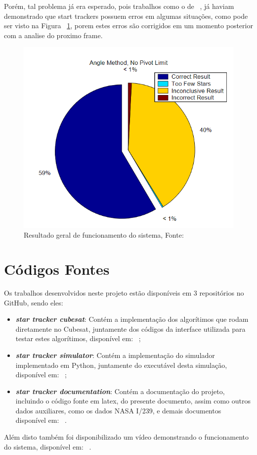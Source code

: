 Porém, tal problema já era esperado, pois trabalhos como o de ~\cite{Cole},
já haviam demonstrado que start trackers possuem erros em algumas situações, como pode ser visto na Figura ~\ref{fig:me_salva},
porem estes erros são corrigidos em um momento posterior com a analise do proximo frame.

\begin{figure}[H]
    \centering
    \includegraphics[width=.8\textwidth]{images/me_salva.png}
    \caption{Resultado geral de funcionamento do sistema, Fonte: ~\cite{Cole}}
    \label{fig:me_salva}
\end{figure}



\section{Códigos Fontes}

Os trabalhos desenvolvidos neste projeto estão disponíveis em 3 repositórios no GitHub, sendo eles:

\begin{itemize}
    \item \textbf{\textit{star tracker cubesat}}: Contém a implementação dos algorítimos que rodam diretamente no Cubesat, 
    juntamente dos códigos da interface utilizada para testar estes algorítimos, disponível em: ~\cite[]{Parreira_star_tracker_cubesat_2022};
    \item \textbf{\textit{star tracker simulator}}: Contém a implementação do simulador implementado em Python, 
    juntamente do executável desta simulação, disponível em: ~\cite[]{Parreira_Star_Tracker_Simulator_2022};
    \item \textbf{\textit{star tracker documentation}}: Contém a documentação do projeto, 
    incluindo o código fonte em latex, do presente documento, assim como outros dados auxiliares, 
    como os dados NASA I/239, e demais documentos disponível em: ~\cite[]{rep_documentation}.
\end{itemize}

Além disto também foi disponibilizado um vídeo demonstrando o funcionamento do sistema, disponível em: ~\cite[]{video}.